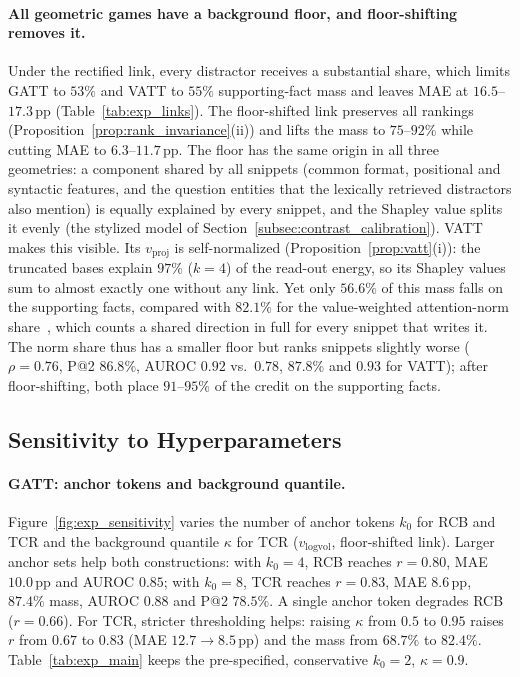 \paragraph{All geometric games have a background floor, and floor-shifting removes it.}
Under the rectified link, every distractor receives a substantial share, which limits GATT to $53\%$ and VATT to $55\%$ supporting-fact mass and leaves MAE at $16.5$--$17.3$\,pp (Table~\ref{tab:exp_links}). The floor-shifted link preserves all rankings (Proposition~\ref{prop:rank_invariance}(ii)) and lifts the mass to $75$--$92\%$ while cutting MAE to $6.3$--$11.7$\,pp. The floor has the same origin in all three geometries: a component shared by all snippets (common format, positional and syntactic features, and the question entities that the lexically retrieved distractors also mention) is equally explained by every snippet, and the Shapley value splits it evenly (the stylized model of Section~\ref{subsec:contrast_calibration}). VATT makes this visible. Its $v_{\text{proj}}$ is self-normalized (Proposition~\ref{prop:vatt}(i)): the truncated bases explain $97\%$ ($k = 4$) of the read-out energy, so its Shapley values sum to almost exactly one without any link. Yet only $56.6\%$ of this mass falls on the supporting facts, compared with $82.1\%$ for the value-weighted attention-norm share~\cite{kobayashi2020attention}, which counts a shared direction in full for every snippet that writes it. The norm share thus has a smaller floor but ranks snippets slightly worse ($\rho = 0.76$, P@2 $86.8\%$, AUROC $0.92$ vs.\ $0.78$, $87.8\%$ and $0.93$ for VATT); after floor-shifting, both place $91$--$95\%$ of the credit on the supporting facts.

\subsection{Sensitivity to Hyperparameters}
\label{subsec:exp_sensitivity}

\paragraph{GATT: anchor tokens and background quantile.}
Figure~\ref{fig:exp_sensitivity} varies the number of anchor tokens $k_0$ for RCB and TCR and the background quantile $\kappa$ for TCR ($v_{\text{logvol}}$, floor-shifted link). Larger anchor sets help both constructions: with $k_0 = 4$, RCB reaches $r = 0.80$, MAE $10.0$\,pp and AUROC $0.85$; with $k_0 = 8$, TCR reaches $r = 0.83$, MAE $8.6$\,pp, $87.4\%$ mass, AUROC $0.88$ and P@2 $78.5\%$. A single anchor token degrades RCB ($r = 0.66$). For TCR, stricter thresholding helps: raising $\kappa$ from $0.5$ to $0.95$ raises $r$ from $0.67$ to $0.83$ (MAE $12.7 \to 8.5$\,pp) and the mass from $68.7\%$ to $82.4\%$. Table~\ref{tab:exp_main} keeps the pre-specified, conservative $k_0 = 2$, $\kappa = 0.9$.

